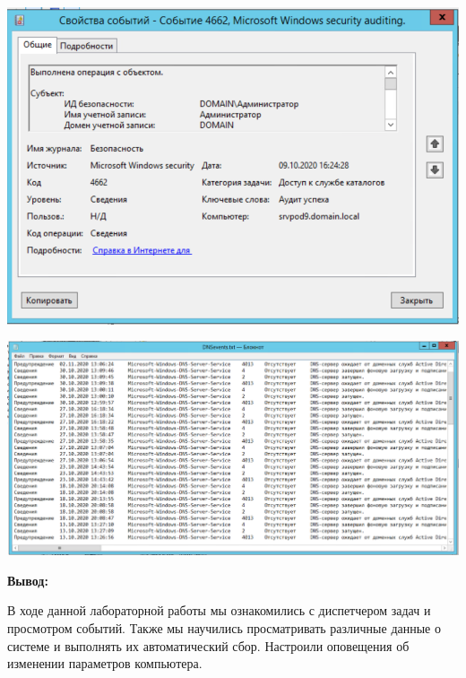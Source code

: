 \documentclass[a4paper,14pt]{extarticle}
\begin{document}
    \begin{center}
        \includegraphics[scale=0.7]{24.c.png}
    \end{center}

    \begin{center}
        \includegraphics[scale=0.5]{24.d.png}
    \end{center}

    \textbf{Вывод:}

    В ходе данной лабораторной работы мы ознакомились с диспетчером задач и 
    просмотром событий. Также мы научились просматривать различные данные о 
    системе и выполнять их автоматический сбор. Настроили оповещения об 
    изменении параметров компьютера.
\end{document}
